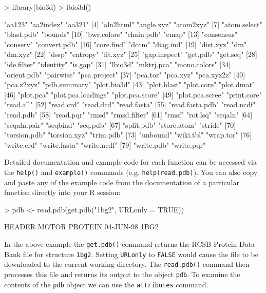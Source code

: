\documentclass[a4paper]{article}
\begin{document}
\begin{Schunk}
\begin{Sinput}
> library(bio3d)
> lbio3d()
\end{Sinput}
\begin{Soutput}
 [1] "aa123"             "aa2index"          "aa321"            
 [4] "aln2html"          "angle.xyz"         "atom2xyz"         
 [7] "atom.select"       "blast.pdb"         "bounds"           
[10] "bwr.colors"        "chain.pdb"         "cmap"             
[13] "consensus"         "conserv"           "convert.pdb"      
[16] "core.find"         "dccm"              "diag.ind"         
[19] "dist.xyz"          "dm"                "dm.xyz"           
[22] "dssp"              "entropy"           "fit.xyz"          
[25] "gap.inspect"       "get.pdb"           "get.seq"          
[28] "ide.filter"        "identity"          "is.gap"           
[31] "lbio3d"            "mktrj.pca"         "mono.colors"      
[34] "orient.pdb"        "pairwise"          "pca.project"      
[37] "pca.tor"           "pca.xyz"           "pca.xyz2z"        
[40] "pca.z2xyz"         "pdb.summary"       "plot.bio3d"       
[43] "plot.blast"        "plot.core"         "plot.dmat"        
[46] "plot.pca"          "plot.pca.loadings" "plot.pca.score"   
[49] "plot.pca.scree"    "print.core"        "read.all"         
[52] "read.crd"          "read.dcd"          "read.fasta"       
[55] "read.fasta.pdb"    "read.ncdf"         "read.pdb"         
[58] "read.pqr"          "rmsd"              "rmsd.filter"      
[61] "rmsf"              "rot.lsq"           "seqaln"           
[64] "seqaln.pair"       "seqbind"           "seq.pdb"          
[67] "split.pdb"         "store.atom"        "stride"           
[70] "torsion.pdb"       "torsion.xyz"       "trim.pdb"         
[73] "unbound"           "wiki.tbl"          "wrap.tor"         
[76] "write.crd"         "write.fasta"       "write.ncdf"       
[79] "write.pdb"         "write.pqr"        
\end{Soutput}
\end{Schunk}
Detailed documentation and example code for each function can be accessed via the \texttt{help()} and \texttt{example()} commands (e.g. \texttt{help(read.pdb)}).  You can also copy and paste any of the example code from the documentation of a particular function directly into your R session:

\begin{Schunk}
\begin{Sinput}
> pdb <- read.pdb(get.pdb("1bg2", URLonly = TRUE))
\end{Sinput}
\begin{Soutput}
  HEADER    MOTOR PROTEIN                           04-JUN-98   1BG2               
\end{Soutput}
\end{Schunk}
In the above example the \texttt{get.pdb()} command returns the RCSB Protein Data Bank file for structure \texttt{1bg2}.  Setting \texttt{URLonly} to \texttt{FALSE} would cause the file to be downloaded to the current working directory.  The \texttt{read.pdb()} command then processes this file and returns its output to the object \texttt{pdb}.  To examine the contents of the \texttt{pdb} object we can use the \texttt{attributes} command.
\end{document}
